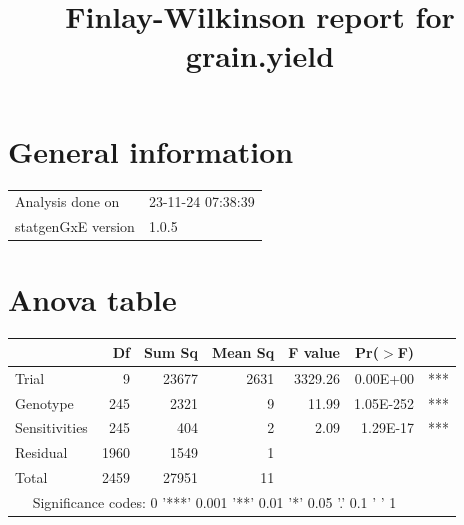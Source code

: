 \documentclass[a4paper,11pt]{article}\usepackage[]{graphicx}\usepackage[]{xcolor}
\title{Finlay-Wilkinson report for grain.yield}%
\author{\vspace{-5ex}}
\date{\vspace{-5ex}}
\begin{document}
\maketitle
\singlespacing

\section{General information}
\begin{table}[ht]
\begin{flushleft}
\begin{tabular}{ll}
  Analysis done on & 23-11-24 07:38:39 \\ 
  statgenGxE version & 1.0.5 \\ 
  \end{tabular}
\label{general}
\end{flushleft}
\end{table}


\section{Anova table}

\begin{table}[ht]
\begin{flushleft}
\label{anova}
\begin{tabular}{lrrrrrl}
  \hline
 & Df & Sum Sq & Mean Sq & F value & Pr($>$F) &  \\ 
  \hline
Trial & 9 & 23677 & 2631 & 3329.26 & 0.00E+00 & *** \\ 
  Genotype & 245 & 2321 & 9 & 11.99 & 1.05E-252 & *** \\ 
  Sensitivities & 245 & 404 & 2 & 2.09 & 1.29E-17 & *** \\ 
  Residual & 1960 & 1549 & 1 &  &  &  \\ 
  Total & 2459 & 27951 & 11 &  &  &  \\ 
   \hline  \multicolumn{6}{c}{Significance codes: 0 '***' 0.001 '**' 0.01 '*' 0.05 '.' 0.1 ' ' 1 } \\ \hline
\end{tabular}
\end{flushleft}
\end{table}
\end{document}
